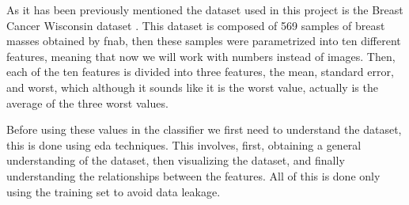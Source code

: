 As it has been previously mentioned the dataset used in this project is the Breast Cancer Wisconsin dataset \cite{william_wolberg_breast_1993}. This dataset is composed of 569 samples of breast masses obtained by \ac{fnab}, then these samples were parametrized into ten different features, meaning that now we will work with numbers instead of images. Then, each of the ten features is divided into three features, the mean, standard error, and worst, which although it sounds like it is the worst value, actually is the average of the three worst values.


Before using these values in the classifier we first need to understand the dataset, this is done using \ac{eda} techniques. This involves, first, obtaining a general understanding of the dataset, then visualizing the dataset, and finally understanding the relationships between the features. All of this is done only using the training set to avoid data leakage.

